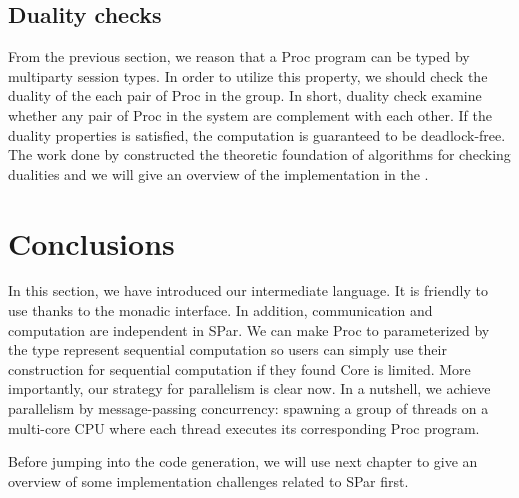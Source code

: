 \subsection{Duality checks}
From the previous section, we reason that a Proc program can be typed  by multiparty session types. In order to utilize this property, we should check the duality of the each pair of Proc in the group. In short, duality check examine whether any pair of Proc in the system are complement with each other. If the duality properties is satisfied, the computation is guaranteed to be deadlock-free. The work done by \cite{coppoGentleIntroductionMultiparty2015} constructed the theoretic foundation of algorithms for checking dualities and we will give an overview of the implementation in the .
\section{Conclusions}
In this section, we have introduced our intermediate language. It is friendly to use thanks to the monadic interface. In addition, communication and computation are independent in SPar. We can make Proc to parameterized by the type represent sequential computation so users can simply use their construction for sequential computation if they found Core is limited. More importantly, our strategy for parallelism is clear now. In a nutshell, we achieve parallelism by message-passing concurrency: spawning a group of threads on a multi-core CPU where each thread executes its corresponding Proc program.

Before jumping into the code generation, we will use next chapter to give an overview of some implementation challenges related to SPar first.